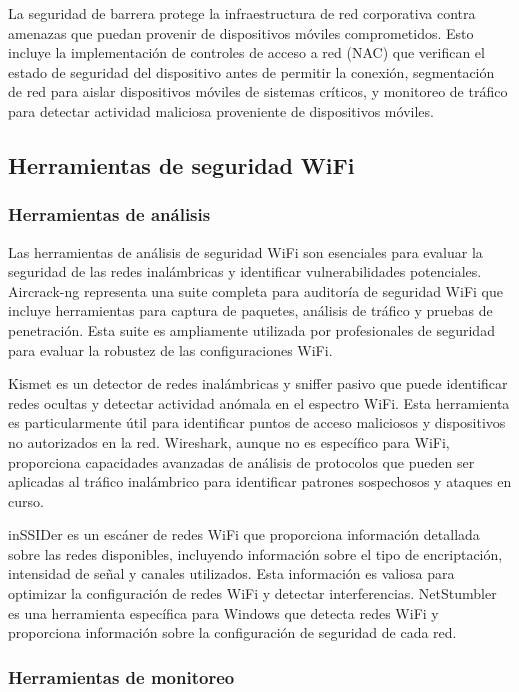 La seguridad de barrera protege la infraestructura de red corporativa contra amenazas que puedan provenir de dispositivos móviles comprometidos. Esto incluye la implementación de controles de acceso a red (NAC) que verifican el estado de seguridad del dispositivo antes de permitir la conexión, segmentación de red para aislar dispositivos móviles de sistemas críticos, y monitoreo de tráfico para detectar actividad maliciosa proveniente de dispositivos móviles.

\subsection{Herramientas de seguridad WiFi}

\subsubsection{Herramientas de análisis}

Las herramientas de análisis de seguridad WiFi son esenciales para evaluar la seguridad de las redes inalámbricas y identificar vulnerabilidades potenciales. Aircrack-ng representa una suite completa para auditoría de seguridad WiFi que incluye herramientas para captura de paquetes, análisis de tráfico y pruebas de penetración. Esta suite es ampliamente utilizada por profesionales de seguridad para evaluar la robustez de las configuraciones WiFi.

Kismet es un detector de redes inalámbricas y sniffer pasivo que puede identificar redes ocultas y detectar actividad anómala en el espectro WiFi. Esta herramienta es particularmente útil para identificar puntos de acceso maliciosos y dispositivos no autorizados en la red. Wireshark, aunque no es específico para WiFi, proporciona capacidades avanzadas de análisis de protocolos que pueden ser aplicadas al tráfico inalámbrico para identificar patrones sospechosos y ataques en curso.

inSSIDer es un escáner de redes WiFi que proporciona información detallada sobre las redes disponibles, incluyendo información sobre el tipo de encriptación, intensidad de señal y canales utilizados. Esta información es valiosa para optimizar la configuración de redes WiFi y detectar interferencias. NetStumbler es una herramienta específica para Windows que detecta redes WiFi y proporciona información sobre la configuración de seguridad de cada red.

\subsubsection{Herramientas de monitoreo}

